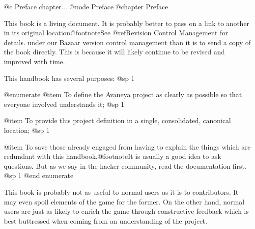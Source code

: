 @c Preface chapter...
@node Preface
@chapter Preface

This book is a living document. It is probably better to pass on a link to another in its original location@footnote{See @ref{Revision Control Management} for details.} under our Bazaar version control management than it is to send a copy of the book directly. This is because it will likely continue to be revised and improved with time.

This handbook has several purposes:
@sp 1

@enumerate
@item
To define the Avaneya project as clearly as possible so that everyone involved understands it;
@sp 1

@item
To provide this project definition in a single, consolidated, canonical location;
@sp 1

@item
To save those already engaged from having to explain the things which are redundant with this handbook.@footnote{It is usually a good idea to ask questions. But as we say in the hacker community, read the documentation first.}
@sp 1
@end enumerate

This book is probably not as useful to normal users as it is to contributors. It may even spoil elements of the game for the former. On the other hand, normal users are just as likely to enrich the game through constructive feedback which is best buttressed when coming from an understanding of the project.


